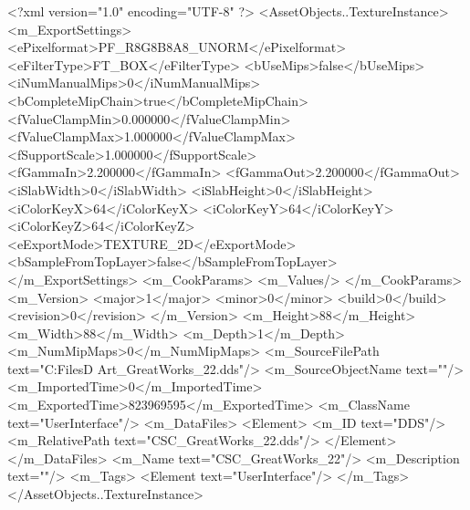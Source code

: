 <?xml version="1.0" encoding="UTF-8" ?>
<AssetObjects..TextureInstance>
	<m_ExportSettings>
		<ePixelformat>PF_R8G8B8A8_UNORM</ePixelformat>
		<eFilterType>FT_BOX</eFilterType>
		<bUseMips>false</bUseMips>
		<iNumManualMips>0</iNumManualMips>
		<bCompleteMipChain>true</bCompleteMipChain>
		<fValueClampMin>0.000000</fValueClampMin>
		<fValueClampMax>1.000000</fValueClampMax>
		<fSupportScale>1.000000</fSupportScale>
		<fGammaIn>2.200000</fGammaIn>
		<fGammaOut>2.200000</fGammaOut>
		<iSlabWidth>0</iSlabWidth>
		<iSlabHeight>0</iSlabHeight>
		<iColorKeyX>64</iColorKeyX>
		<iColorKeyY>64</iColorKeyY>
		<iColorKeyZ>64</iColorKeyZ>
		<eExportMode>TEXTURE_2D</eExportMode>
		<bSampleFromTopLayer>false</bSampleFromTopLayer>
	</m_ExportSettings>
	<m_CookParams>
		<m_Values/>
	</m_CookParams>
	<m_Version>
		<major>1</major>
		<minor>0</minor>
		<build>0</build>
		<revision>0</revision>
	</m_Version>
	<m_Height>88</m_Height>
	<m_Width>88</m_Width>
	<m_Depth>1</m_Depth>
	<m_NumMipMaps>0</m_NumMipMaps>
	<m_SourceFilePath text="C:\Users\Shadow\Desktop\Working Files\2D Art\GreatWorks\CSC_GreatWorks_22.dds"/>
	<m_SourceObjectName text=""/>
	<m_ImportedTime>0</m_ImportedTime>
	<m_ExportedTime>823969595</m_ExportedTime>
	<m_ClassName text="UserInterface"/>
	<m_DataFiles>
		<Element>
			<m_ID text="DDS"/>
			<m_RelativePath text="CSC_GreatWorks_22.dds"/>
		</Element>
	</m_DataFiles>
	<m_Name text="CSC_GreatWorks_22"/>
	<m_Description text=""/>
	<m_Tags>
		<Element text="UserInterface"/>
	</m_Tags>
</AssetObjects..TextureInstance>

